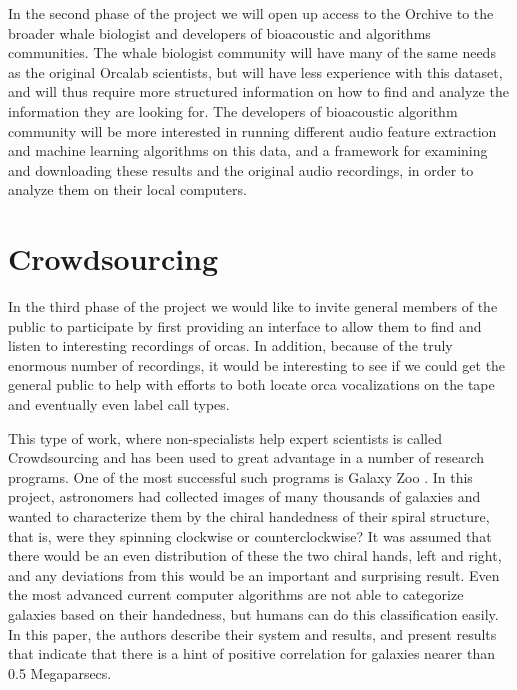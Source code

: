 In the second phase of the project we will open up access to the
Orchive to the broader whale biologist and developers of bioacoustic
and algorithms communities.  The whale biologist community will have
many of the same needs as the original Orcalab scientists, but will
have less experience with this dataset, and will thus require more
structured information on how to find and analyze the information they
are looking for.  The developers of bioacoustic algorithm community
will be more interested in running different audio feature extraction
and machine learning algorithms on this data, and a framework for
examining and downloading these results and the original audio
recordings, in order to analyze them on their local computers.

\section{Crowdsourcing}

In the third phase of the project we would like to invite general
members of the public to participate by first providing an interface
to allow them to find and listen to interesting recordings of orcas.
In addition, because of the truly enormous number of recordings, it
would be interesting to see if we could get the general public to help
with efforts to both locate orca vocalizations on the tape and
eventually even label call types.  

This type of work, where non-specialists help expert scientists is
called Crowdsourcing \cite{travis08_crowdsourcing}
\cite{bradham08_crowdsourcing} \cite{howe08_crowdsourcing}
\cite{surowiecki05_crowdsourcing} and has been used to great advantage
in a number of research programs.  One of the most successful such
programs is Galaxy Zoo \cite{anze08_galaxyzoo}.  In this project,
astronomers had collected images of many thousands of galaxies and
wanted to characterize them by the chiral handedness of their spiral
structure, that is, were they spinning clockwise or counterclockwise?
It was assumed that there would be an even distribution of these the
two chiral hands, left and right, and any deviations from this would
be an important and surprising result.  Even the most advanced current
computer algorithms are not able to categorize galaxies based on their
handedness, but humans can do this classification easily.  In this
paper, the authors describe their system and results, and present
results that indicate that there is a hint of positive correlation for
galaxies nearer than 0.5 Megaparsecs.

